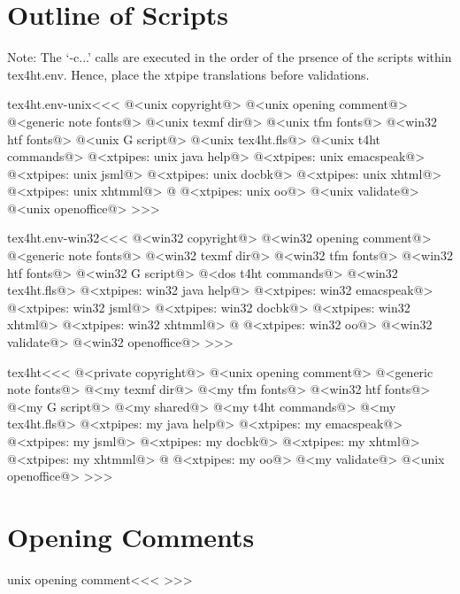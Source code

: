 \documentclass{article}
\begin{document}
\section{Outline of Scripts}

Note: The `-c...' calls are executed in the order of the prsence of
the scripts within tex4ht.env.  Hence, place the xtpipe translations
before validations.


\<tex4ht.env-unix\><<<
@<unix copyright@>%
@<unix opening comment@>%
@<generic note fonts@>%
@<unix texmf dir@>%
@<unix tfm fonts@>%
@<win32 htf fonts@>%
@<unix G script@>%
@<unix tex4ht.fls@>%
@<unix t4ht commands@>%
@<xtpipes: unix java help@>
@<xtpipes: unix emacspeak@>
@<xtpipes: unix jsml@>
@<xtpipes: unix docbk@>
@<xtpipes: unix xhtml@> 
@<xtpipes: unix xhtmml@> @%
@<xtpipes: unix oo@>%
@<unix validate@> %
@<unix openoffice@>%
>>>


\<tex4ht.env-win32\><<<
@<win32 copyright@>%
@<win32 opening comment@>%
@<generic note fonts@>%
@<win32 texmf dir@>%
@<win32 tfm fonts@>%
@<win32 htf fonts@>%
@<win32 G script@>%
@<dos t4ht commands@>%
@<win32 tex4ht.fls@>%
@<xtpipes: win32 java help@>
@<xtpipes: win32 emacspeak@>
@<xtpipes: win32 jsml@>
@<xtpipes: win32 docbk@>
@<xtpipes: win32 xhtml@> 
@<xtpipes: win32 xhtmml@> @%
@<xtpipes: win32 oo@>%
@<win32 validate@> %
@<win32 openoffice@>%
>>>



\<tex4ht\><<<
@<private copyright@>%
@<unix opening comment@>%
@<generic note fonts@>%
@<my texmf dir@>%
@<my tfm fonts@>%
@<win32 htf fonts@>%
@<my G script@>%
@<my shared@>%
@<my t4ht commands@>%
@<my tex4ht.fls@>%
@<xtpipes: my java help@>
@<xtpipes: my emacspeak@>
@<xtpipes: my jsml@>
@<xtpipes: my docbk@>
@<xtpipes: my xhtml@>
@<xtpipes: my xhtmml@>  @%
@<xtpipes: my oo@>
@<my validate@> %
@<unix openoffice@>%
>>>





\section{Opening Comments}

\<unix opening comment\><<<
%
%
%
%
%
>>>
\end{document}
